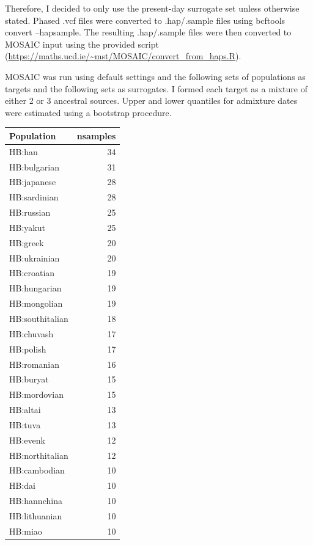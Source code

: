 Therefore, I decided to only use the present-day surrogate set unless otherwise stated. Phased .vcf files were converted to .hap/.sample files using bcftools convert --hapsample. The resulting .hap/.sample files were then converted to MOSAIC input using the provided script (\url{https://maths.ucd.ie/~mst/MOSAIC/convert_from_haps.R}).

MOSAIC was run using default settings and the following sets of populations as targets and the following sets as surrogates. I formed each target as a mixture of either 2 or 3 ancestral sources. Upper and lower quantiles for admixture dates were estimated using a bootstrap procedure. 

\begin{table}
\small
\begin{tabular}{l|r}
\hline
Population & nsamples\\
\hline
HB:han & 34\\
\hline
HB:bulgarian & 31\\
\hline
HB:japanese & 28\\
\hline
HB:sardinian & 28\\
\hline
HB:russian & 25\\
\hline
HB:yakut & 25\\
\hline
HB:greek & 20\\
\hline
HB:ukrainian & 20\\
\hline
HB:croatian & 19\\
\hline
HB:hungarian & 19\\
\hline
HB:mongolian & 19\\
\hline
HB:southitalian & 18\\
\hline
HB:chuvash & 17\\
\hline
HB:polish & 17\\
\hline
HB:romanian & 16\\
\hline
HB:buryat & 15\\
\hline
HB:mordovian & 15\\
\hline
HB:altai & 13\\
\hline
HB:tuva & 13\\
\hline
HB:evenk & 12\\
\hline
HB:northitalian & 12\\
\hline
HB:cambodian & 10\\
\hline
HB:dai & 10\\
\hline
HB:hannchina & 10\\
\hline
HB:lithuanian & 10\\
\hline
HB:miao & 10\\
\hline

\end{tabular}
\end{table}
